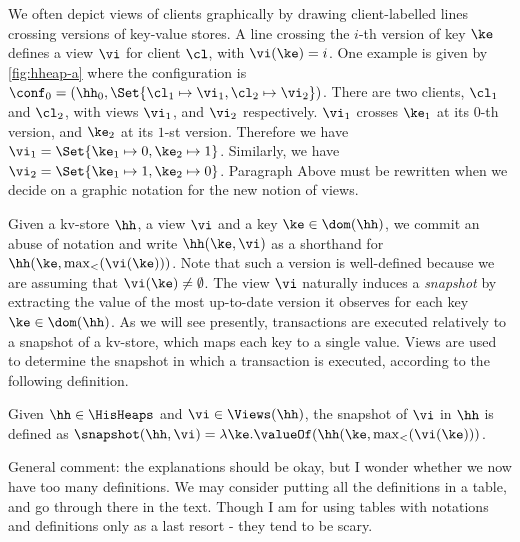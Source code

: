 {\color{red} We often depict views of clients graphically by drawing client-labelled lines crossing 
versions of key-value stores. A line crossing the $i$-th version of key $\ke$ defines a view 
$\vi$ for client $\cl$, with $\vi(\ke) = i$. One example is given by \cref{fig:hheap-a} where the configuration is
$\conf_0 = (\hh_0, \Set{\cl_1 \mapsto \vi_1, \cl_2 \mapsto \vi_2})$. 
There are two clients, 
$\cl_1$ and $\cl_2$, with views $\vi_1$, and $\vi_2$ respectively. $\vi_1$ crosses $\ke_1$ at its $0$-th 
version, and $\ke_2$ at its $1$-st version. Therefore we have $\vi_1 = \Set{\ke_1 \mapsto 0, \ke_2 \mapsto 1}$. 
Similarly, we have $\vi_2 = \Set{\ke_1 \mapsto 1, \ke_2 \mapsto 0}$. }
\ac{Paragraph Above must be rewritten when we decide on a graphic notation for 
the new notion of views.}

Given a kv-store $\hh$, a view $\vi$ and a key $\ke \in \dom(\hh)$, 
we commit an abuse of notation and write $\hh(\ke, \vi)$ as a shorthand 
for $\hh(\ke, \max_{<}(\vi(\ke)))$. Note that such a version is well-defined because 
we are assuming that $\vi(\ke) \neq \emptyset$.
The view $\vi$ naturally induces a \emph{snapshot} 
by extracting the value of the most up-to-date version it observes for each key $\ke \in \dom(\hh)$. 
As we will see presently, transactions are executed relatively 
to a snapshot of a kv-store, which maps each key to a single value.
Views are used to determine the snapshot in which a transaction 
is executed, according to the following definition.
\begin{definition}[Snapshots]
\label{def:heaps}
\label{def:snapshot}
Given $\hh \in \HisHeaps$ and $\vi \in \Views(\hh)$, the snapshot of $\vi$ in 
$\hh$ is defined as $\snapshot(\hh, \vi) = \lambda \ke. \valueOf(\hh(\ke, \max_{<}(\vi(\ke)))$.
\end{definition}

\ac{General comment: the explanations should be okay, but I wonder whether we now have 
too many definitions. We may consider putting all the definitions in a table, and 
go through there in the text. Though I am for using tables with notations and 
definitions only as a last resort - they tend to be scary.}

